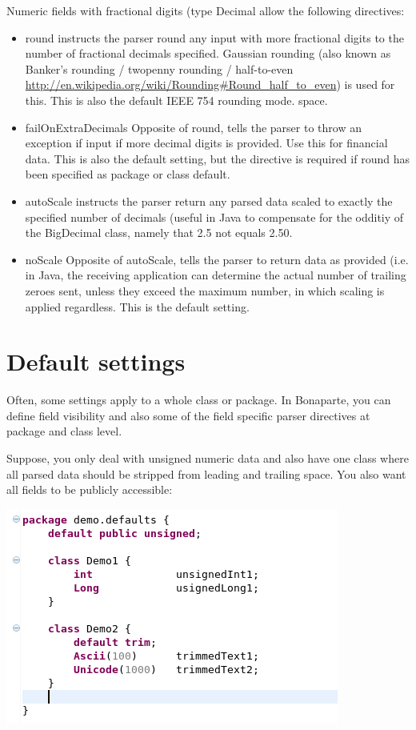 \documentclass[11pt,a4paper,oneside]{article}
\begin{document}
Numeric fields with fractional digits (type {\ttfamily Decimal} allow the following directives:
\begin{itemize}
  \item {\ttfamily round} instructs the parser round any input with more fractional digits to the number of fractional decimals
  specified. Gaussian rounding (also known as Banker's rounding / twopenny rounding / half-to-even
  \url{http://en.wikipedia.org/wiki/Rounding#Round_half_to_even}) is used for this. This is also the default IEEE 754 rounding
  mode. space.
  \item {\ttfamily failOnExtraDecimals} Opposite of {\ttfamily round}, tells the parser to throw an exception if input if more
  decimal digits is provided. Use this for financial data. This is also the default setting, but the directive is required if
  {\ttfamily round} has been specified as package or class default.
  \item {\ttfamily autoScale} instructs the parser return any parsed data scaled to exactly the specified number of decimals
  (useful in Java to compensate for the odditiy of the {\ttfamily BigDecimal} class, namely that 2.5 not equals 2.50.
  \item {\ttfamily noScale} Opposite of {\ttfamily autoScale}, tells the parser to return data as provided (i.e. in Java,
  the receiving application can determine the actual number of trailing zeroes sent, unless they exceed the maximum number, in
  which scaling is applied regardless. This is the default setting.
\end{itemize}

\section{Default settings}
Often, some settings apply to a whole class or package. 
In Bonaparte, you can define field visibility and also some of the field specific parser directives at package and class level.

Suppose, you only deal with unsigned numeric data and also have one class where all parsed data should be stripped from leading and trailing space.
You also want all fields to be publicly accessible:

\vspace{2mm}

\hspace{1cm}\includegraphics[scale=0.5]{images/tut1-009-defaults.png}
 
\end{document}
